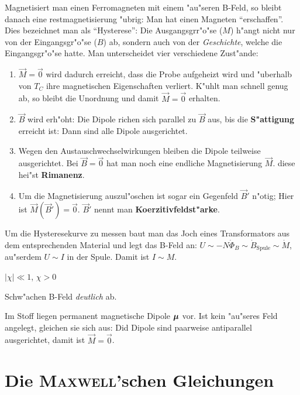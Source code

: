 \begin{description}[\setlabelstyle{\bfseries\slshape}]
Magnetisiert man einen Ferromagneten mit einem "au"seren B-Feld, so
bleibt danach eine restmagnetisierung "ubrig: Man hat einen Magneten
"`erschaffen"'. Dies bezeichnet man als
"`Hysterese"': Die Ausgangsgrr"o"se ($M$) h"angt nicht
nur von der Eingangsgr"o"se ($B$) ab, sondern auch von der
\emph{Geschichte}, welche die Eingangsgr"o"se hatte. Man unterscheidet
vier verschiedene Zust"ande:
\begin{enumerate}
\item $\vec M = \vec 0$ wird dadurch erreicht, dass die Probe
   aufgeheizt wird und "uberhalb von $T_C$ ihre magnetischen
   Eigenschaften verliert. K"uhlt man schnell genug ab, so bleibt die
   Unordnung und damit $\vec M = \vec 0$ erhalten.
\item $\vec B$ wird erh"oht: Die Dipole richen sich parallel zu $\vec
   B$ aus, bis die \textbf{S"attigung} erreicht ist:
   Dann sind alle Dipole ausgerichtet.
\item Wegen den Austauschwechselwirkungen bleiben die Dipole teilweise
   ausgerichtet. Bei $\vec B = \vec 0$ hat man noch eine endliche
   Magnetisierung $\vec M$. diese hei"st \textbf{Rimanenz}.
\item Um die Magnetisierung auszul"oschen ist sogar ein Gegenfeld $\vec
   B'$ n"otig; Hier ist $\vec M (\vec B') = \vec 0$. $\vec B'$ nennt
   man \textbf{Koerzitivfeldst"arke}.
\end{enumerate}
Um die Hysteresekurve zu messen baut man das Joch eines Transformators
aus dem entsprechenden Material und legt das B-Feld an: $U \sim -N
\dot \Phi_B \sim \dot B_\text{Spule} \sim \dot M$, au"serdem $U \sim I$ in der
Spule. Damit ist $I \sim M$.

\item[Antiferromagnete]  $|\chi| \ll 1$, $\chi > 0$

Schw"achen B-Feld \emph{deutlich} ab.

\bigskip

Im Stoff liegen permanent magnetische Dipole $\boldsymbol{\mu}$ vor. Ist kein
"au"seres Feld angelegt, gleichen sie sich aus: Did Dipole sind
paarweise antiparallel ausgerichtet, damit ist $\vec M = \vec 0$.
\end{description}











\section{Die \textsc{Maxwell}'schen Gleichungen}
\label{kap_maxwellschen-gleichungen}

